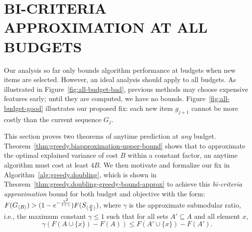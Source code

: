         
        


\section{BI-CRITERIA APPROXIMATION AT ALL BUDGETS}

Our analysis so far only bounds algorithm performance at 
budgets when new items are selected. However, an ideal analysis
should apply to all budgets. As illustrated in Figure~\ref{fig:all-budget-bad},
previous methods may choose expensive features early; 
until they are computed, we have no bounds. 
Figure~\ref{fig:all-budget-good} illustrates our proposed fix: each 
new item $g_{j+1}$ cannot be more costly than the current sequence $G_{j}$. 

This section proves two theorems of anytime prediction at \textit{any} budget.  Theorem~\ref{thm:greedy.biapproximation-upper-bound} shows that
 to approximate the optimal explained variance 
of cost $B$ within a constant factor,
an anytime algorithm must cost at least $4B$. 
We then motivate and formalize our fix in Algorithm~\ref{alg:greedy.doubling},
which is shown in
Theorem~\ref{thm:greedy.doubling-greedy-bound-approx} to achieve this
\textit{bi-criteria approximation} bound for both budget and objective with
the form: \mbox{$F(G_{\langle B \rangle}) > (1 - e^{-\frac{\gamma^2}{1+\gamma}}) F(S_{\langle \frac{B}{4} \rangle})$}, where $\gamma$ is the approximate submodular
ratio, i.e., the maximum constant $\gamma \leq 1$ such that for 
all sets $ A' \subseteq A$ and all element $x$,
\begin{equation}
\label{def:greedy.approx-submodularity}
    \gamma (F(A \cup \{x\}) - F(A)) \leq F(A' \cup \{x\}) - F(A').
\end{equation}

